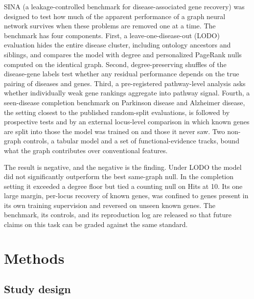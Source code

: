 \documentclass[11pt]{article}
\begin{document}
SINA (a leakage-controlled benchmark for disease-associated gene recovery) was designed to test how much of the apparent performance of a graph neural network survives when these problems are removed one at a time. The benchmark has four components. First, a leave-one-disease-out (LODO) evaluation hides the entire disease cluster, including ontology ancestors and siblings, and compares the model with degree and personalized PageRank nulls computed on the identical graph. Second, degree-preserving shuffles of the disease-gene labels test whether any residual performance depends on the true pairing of diseases and genes. Third, a pre-registered pathway-level analysis asks whether individually weak gene rankings aggregate into pathway signal. Fourth, a seen-disease completion benchmark on Parkinson disease and Alzheimer disease, the setting closest to the published random-split evaluations, is followed by prospective tests and by an external locus-level comparison in which known genes are split into those the model was trained on and those it never saw. Two non-graph controls, a tabular model and a set of functional-evidence tracks, bound what the graph contributes over conventional features.

The result is negative, and the negative is the finding. Under LODO the model did not significantly outperform the best same-graph null. In the completion setting it exceeded a degree floor but tied a counting null on Hits at 10. Its one large margin, per-locus recovery of known genes, was confined to genes present in its own training supervision and reversed on unseen known genes. The benchmark, its controls, and its reproduction log are released so that future claims on this task can be graded against the same standard.

\section{Methods}

\subsection{Study design}
\end{document}
